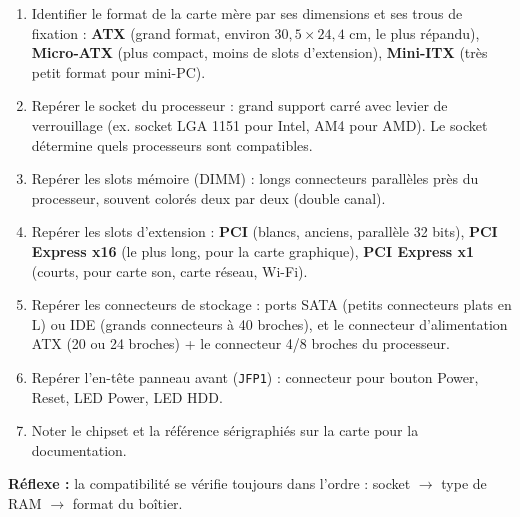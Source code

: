 \documentclass[11pt]{article}
\newcommand{\cle}[1]{{\popxbold\color{popdark}#1}}
\begin{document}
\begin{methode}
\begin{enumerate}
\item \cle{Identifier le format} de la carte mère par ses dimensions et ses trous de fixation : \textbf{ATX} (grand format, environ $30{,}5 \times 24{,}4$ cm, le plus répandu), \textbf{Micro-ATX} (plus compact, moins de slots d'extension), \textbf{Mini-ITX} (très petit format pour mini-PC).
\item \cle{Repérer le socket du processeur} : grand support carré avec levier de verrouillage (ex. socket LGA 1151 pour Intel, AM4 pour AMD). Le socket détermine quels processeurs sont compatibles.
\item \cle{Repérer les slots mémoire} (DIMM) : longs connecteurs parallèles près du processeur, souvent colorés deux par deux (double canal).
\item \cle{Repérer les slots d'extension} : \textbf{PCI} (blancs, anciens, parallèle 32 bits), \textbf{PCI Express x16} (le plus long, pour la carte graphique), \textbf{PCI Express x1} (courts, pour carte son, carte réseau, Wi-Fi).
\item \cle{Repérer les connecteurs de stockage} : ports SATA (petits connecteurs plats en L) ou IDE (grands connecteurs à 40 broches), et le connecteur d'alimentation ATX (20 ou 24 broches) + le connecteur 4/8 broches du processeur.
\item \cle{Repérer l'en-tête panneau avant} (\texttt{JFP1}) : connecteur pour bouton Power, Reset, LED Power, LED HDD.
\item \cle{Noter} le chipset et la référence sérigraphiés sur la carte pour la documentation.
\end{enumerate}
\textbf{Réflexe :} la compatibilité se vérifie toujours dans l'ordre : socket $\rightarrow$ type de RAM $\rightarrow$ format du boîtier.
\end{methode}
\end{document}
